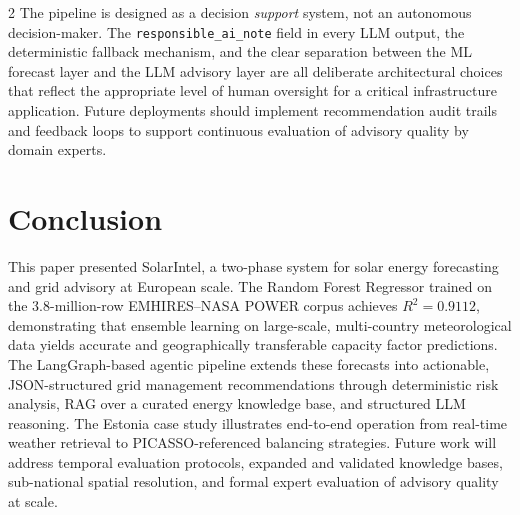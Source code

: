 \documentclass[11pt]{article}
\begin{document}
\begin{multicols}{2}
The pipeline is designed as a decision \emph{support} system, not an
autonomous decision-maker. The \texttt{responsible\_ai\_note} field in every
LLM output, the deterministic fallback mechanism, and the clear separation
between the ML forecast layer and the LLM advisory layer are all deliberate
architectural choices that reflect the appropriate level of human oversight
for a critical infrastructure application. Future deployments should implement
recommendation audit trails and feedback loops to support continuous evaluation
of advisory quality by domain experts.

\section{Conclusion}

This paper presented SolarIntel, a two-phase system for solar energy
forecasting and grid advisory at European scale. The Random Forest Regressor
trained on the 3.8-million-row EMHIRES--NASA POWER corpus achieves
$R^2 = 0.9112$, demonstrating that ensemble learning on large-scale,
multi-country meteorological data yields accurate and geographically
transferable capacity factor predictions. The LangGraph-based agentic pipeline
extends these forecasts into actionable, JSON-structured grid management
recommendations through deterministic risk analysis, RAG over a curated
energy knowledge base, and structured LLM reasoning. The Estonia case study
illustrates end-to-end operation from real-time weather retrieval to
PICASSO-referenced balancing strategies. Future work will address temporal
evaluation protocols, expanded and validated knowledge bases, sub-national
spatial resolution, and formal expert evaluation of advisory quality at scale.

\end{multicols}
\newpage
\end{document}

